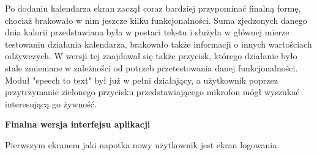\documentclass[12pt, a4paper]{article}
\begin{document}
\begin{sloppypar}
{{    Po dodaniu kalendarza ekran zaczął coraz bardziej przypominać finalną formę, chociaż
    brakowało w nim jeszcze kilku funkcjonalności. Suma zjedzonych danego dnia kalorii
    przedstawiana była w postaci tekstu i służyła w głównej mierze testowaniu działania
    kalendarza, brakowało także informacji o innych wartościach odżywczych. W wersji tej
    znajdował się także przycisk, którego działanie było stale zmieniane w zależności od
    potrzeb przetestowania danej funkcjonalności. Moduł "speech to text" był już w pełni
    działający, a użytkownik poprzez przytrzymanie zielonego przycisku przedstawiającego
    mikrofon mógł wyszukać interesującą go żywność.

    \textbf{Finalna wersja interfejsu aplikacji}

    Pierwszym ekranem jaki napotka nowy użytkownik jest ekran logowania.

}}
\end{sloppypar}
\end{document}
